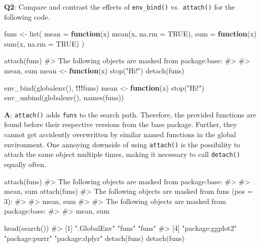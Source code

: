 \documentclass[
]{krantz}
\makeatletter
\newenvironment{Shaded}{\begin{snugshade}}{\end{snugshade}}
\newcommand{\CommentTok}[1]{\textcolor[rgb]{0.56,0.35,0.01}{\textit{#1}}}
\newcommand{\ControlFlowTok}[1]{\textcolor[rgb]{0.13,0.29,0.53}{\textbf{#1}}}
\newcommand{\DataTypeTok}[1]{\textcolor[rgb]{0.13,0.29,0.53}{#1}}
\newcommand{\KeywordTok}[1]{\textcolor[rgb]{0.13,0.29,0.53}{\textbf{#1}}}
\newcommand{\NormalTok}[1]{#1}
\newcommand{\OperatorTok}[1]{\textcolor[rgb]{0.81,0.36,0.00}{\textbf{#1}}}
\newcommand{\OtherTok}[1]{\textcolor[rgb]{0.56,0.35,0.01}{#1}}
\newcommand{\StringTok}[1]{\textcolor[rgb]{0.31,0.60,0.02}{#1}}
\newenvironment{kframe}{%
\medskip{}
\setlength{\fboxsep}{.8em}
 \def\at@end@of@kframe{}%
 \ifinner\ifhmode%
  \def\at@end@of@kframe{\end{minipage}}%
  \begin{minipage}{\columnwidth}%
 \fi\fi%
 \def\FrameCommand##1{\hskip\@totalleftmargin \hskip-\fboxsep
 \colorbox{shadecolor}{##1}\hskip-\fboxsep
     \hskip-\linewidth \hskip-\@totalleftmargin \hskip\columnwidth}%
 \MakeFramed {\advance\hsize-\width
   \@totalleftmargin\z@ \linewidth\hsize
   \@setminipage}}%
 {\par\unskip\endMakeFramed%
 \at@end@of@kframe}
\renewenvironment{Shaded}{\begin{kframe}}{\end{kframe}}
\renewcommand{\KeywordTok} [1]{\textcolor[rgb]{0.00,0.44,0.13}{{#1}}}
\renewcommand{\DataTypeTok}[1]{\textcolor[rgb]{0.56,0.13,0.00}{{#1}}}
\renewcommand{\StringTok}  [1]{\textcolor[rgb]{0.25,0.44,0.63}{{#1}}}
\renewcommand{\CommentTok} [1]{\textcolor[rgb]{0.38,0.63,0.69}{{#1}}}
\renewcommand{\OtherTok}   [1]{\textcolor[rgb]{0.00,0.44,0.13}{{#1}}}
\renewcommand{\NormalTok}  [1]{{#1}}
\makeatother
\begin{document}
\textbf{{Q2}}: Compare and contrast the effects of \texttt{env\_bind()} vs.~\texttt{attach()} for the following code.

\begin{Shaded}
\begin{Highlighting}[]
\NormalTok{funs <-}\StringTok{ }\KeywordTok{list}\NormalTok{(}
  \DataTypeTok{mean =} \ControlFlowTok{function}\NormalTok{(x) }\KeywordTok{mean}\NormalTok{(x, }\DataTypeTok{na.rm =} \OtherTok{TRUE}\NormalTok{),}
  \DataTypeTok{sum =} \ControlFlowTok{function}\NormalTok{(x) }\KeywordTok{sum}\NormalTok{(x, }\DataTypeTok{na.rm =} \OtherTok{TRUE}\NormalTok{)}
\NormalTok{)}

\KeywordTok{attach}\NormalTok{(funs)}
\CommentTok{#> The following objects are masked from package:base:}
\CommentTok{#> }
\CommentTok{#>     mean, sum}
\NormalTok{mean <-}\StringTok{ }\ControlFlowTok{function}\NormalTok{(x) }\KeywordTok{stop}\NormalTok{(}\StringTok{"Hi!"}\NormalTok{)}
\KeywordTok{detach}\NormalTok{(funs)}

\KeywordTok{env_bind}\NormalTok{(}\KeywordTok{globalenv}\NormalTok{(), }\OperatorTok{!!!}\NormalTok{funs)}
\NormalTok{mean <-}\StringTok{ }\ControlFlowTok{function}\NormalTok{(x) }\KeywordTok{stop}\NormalTok{(}\StringTok{"Hi!"}\NormalTok{) }
\KeywordTok{env_unbind}\NormalTok{(}\KeywordTok{globalenv}\NormalTok{(), }\KeywordTok{names}\NormalTok{(funs))}
\end{Highlighting}
\end{Shaded}

\textbf{{A}}: \texttt{attach()} adds \texttt{funs} to the search path. Therefore, the provided functions are found before their respective versions from the base package. Further, they cannot get accidently overwritten by similar named functions in the global environment. One annoying downside of using \texttt{attach()} is the possibility to attach the same object multiple times, making it necessary to call \texttt{detach()} equally often.

\begin{Shaded}
\begin{Highlighting}[]
\KeywordTok{attach}\NormalTok{(funs)}
\CommentTok{#> The following objects are masked from package:base:}
\CommentTok{#> }
\CommentTok{#>     mean, sum}
\KeywordTok{attach}\NormalTok{(funs)}
\CommentTok{#> The following objects are masked from funs (pos = 3):}
\CommentTok{#> }
\CommentTok{#>     mean, sum}
\CommentTok{#> }
\CommentTok{#> The following objects are masked from package:base:}
\CommentTok{#> }
\CommentTok{#>     mean, sum}

\KeywordTok{head}\NormalTok{(}\KeywordTok{search}\NormalTok{())}
\CommentTok{#> [1] ".GlobalEnv"      "funs"            "funs"           }
\CommentTok{#> [4] "package:ggplot2" "package:purrr"   "package:dplyr"}
\KeywordTok{detach}\NormalTok{(funs)}
\KeywordTok{detach}\NormalTok{(funs)}
\end{Highlighting}
\end{Shaded}
\end{document}
